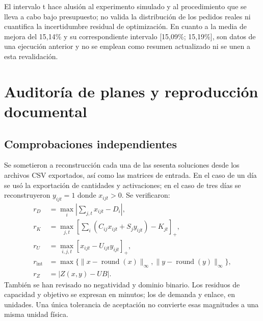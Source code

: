 \documentclass[12pt,a4paper,oneside]{article}
\begin{document}
El intervalo t hace alusión al experimento simulado y al procedimiento que se lleva a cabo bajo presupuesto; no valida la distribución de los pedidos reales ni cuantifica la incertidumbre residual de optimización. En cuanto a la media de mejora del 15,14\% y su correspondiente intervalo [15,09\%; 15,19\%], son datos de una ejecución anterior y no se emplean como resumen actualizado ni se unen a esta revalidación.

\clearpage
\section{Auditoría de planes y reproducción documental}\label{an:repro}
\subsection{Comprobaciones independientes}
Se sometieron a reconstrucción cada una de las sesenta soluciones desde los archivos CSV exportados, así como las matrices de entrada. En el caso de un día se usó la exportación de cantidades y activaciones; en el caso de tres días se reconstruyeron  $y_{ijt}=1$ donde $x_{ijt}>0$. Se verificaron:
\begin{align*}
r_D&=\max_i\left|\sum_{j,t}x_{ijt}-D_i\right|,\\
r_K&=\max_{j,t}\left[\sum_i(C_{ij}x_{ijt}+S_jy_{ijt})-K_{jt}\right]_+,\\
r_U&=\max_{i,j,t}[x_{ijt}-U_{ijt}y_{ijt}]_+,\\
r_{\mathrm{int}}&=\max\{\|x-\operatorname{round}(x)\|_\infty,\|y-\operatorname{round}(y)\|_\infty\},\\
r_Z&=|Z(x,y)-UB|.
\end{align*}
También se han revisado no negatividad y dominio binario. Los residuos de capacidad y objetivo se expresan en minutos; los de demanda y enlace, en unidades. Una única tolerancia de aceptación no convierte esas magnitudes a una misma unidad física.
\end{document}
